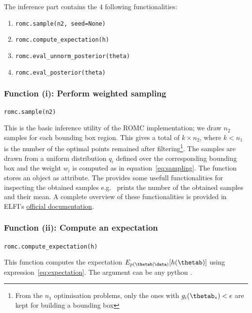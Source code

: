 The inference part contains the 4 following functionalities:

\begin{enumerate}
\item \texttt{romc.sample(n2, seed=None)}
\item \texttt{romc.compute_expectation(h)}  
\item \texttt{romc.eval_unnorm_posterior(theta)}
\item \texttt{romc.eval_posterior(theta)}
\end{enumerate}

\subsubsection*{Function (i): Perform weighted sampling}

\texttt{romc.sample(n2)}
\vspace{5mm}

\noindent
This is the basic inference utility of the ROMC implementation; we
draw $n_2$ samples for each bounding box region. This gives a total of
$k \times n_2$, where $k < n_1$ is the number of the optimal points
remained after filtering\footnote{From the $n_1$ optimisation
  problems, only the ones with $g_i(\thetab_*) < \epsilon$ are kept
  for building a bounding box}. The samples are drawn from a uniform
distribution $q_i$ defined over the corresponding bounding box and the
weight $w_i$ is computed as in equation~\eqref{eq:sampling}. The
function stores an  object as
 attribute. The  provides
some usefull functionalities for inspecting the obtained samples e.g.\
 prints the number of the obtained
samples and their mean. A complete overview of these functionalities is
provided in ELFI's
\href{https://elfi.readthedocs.io/en/latest/api.html#elfi.methods.results.Sample}{official
  documentation}.

\subsubsection*{Function (ii): Compute an expectation}

\texttt{romc.compute_expectation(h)}
\vspace{5mm}

\noindent
This function computes the expectation
$E_{p(\thetab|\data)}[h(\thetab)]$ using
expression~\eqref{eq:expectation}. The argument  can be
any python \pinline{Callable}.

